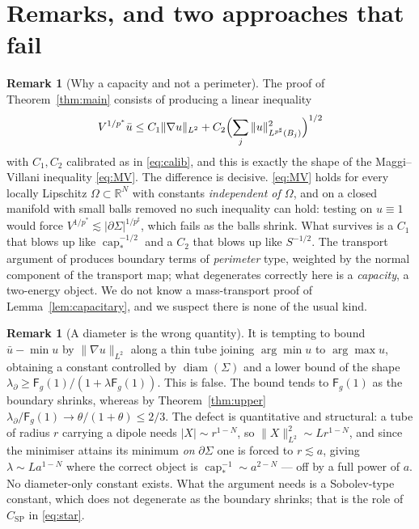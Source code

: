 \documentclass[11pt,reqno]{amsart}
\theoremstyle{plain}
\theoremstyle{definition}
\newtheorem{remark}[theorem]{Remark}
\newcommand{\R}{\mathbb{R}}
\newcommand{\pstar}{p^{*}}
\newcommand{\psharp}{p^{\sharp}}
\newcommand{\cpstar}{\operatorname{cap}_{*}}
\newcommand{\Fq}{\mathsf{F}}
\newcommand{\Csp}{C_{\mathrm{SP}}}
\begin{document}
\section{Remarks, and two approaches that fail}
\label{sec:remarks}

\begin{remark}[Why a capacity and not a perimeter]
\label{rem:mv}
The proof of Theorem~\ref{thm:main} consists of producing a linear inequality
\[
  V^{1/\pstar}\bar u\le C_1\|\nabla u\|_{L^2}+C_2\Bigl(\sum_j\|u\|^2_{L^{\psharp}(B_j)}\Bigr)^{1/2}
\]
with $C_1,C_2$ calibrated as in \eqref{eq:calib}, and this is exactly the shape of
the Maggi--Villani inequality \eqref{eq:MV}. The difference is decisive.
\eqref{eq:MV} holds for every locally Lipschitz $\Omega\subset\R^N$ with constants
\emph{independent of $\Omega$}, and on a closed manifold with small balls removed
no such inequality can hold: testing on $u\equiv1$ would force
$V^{1/\pstar}\lesssim|\partial\Sigma|^{1/\psharp}$, which fails as the balls
shrink. What survives is a $C_1$ that blows up like $\cpstar^{-1/2}$ and a $C_2$
that blows up like $S^{-1/2}$. The transport argument of
\cite{CNV2004,Nazaret2006,MaggiVillani2005} produces boundary terms of
\emph{perimeter} type, weighted by the normal component of the transport map; what
degenerates correctly here is a \emph{capacity}, a two-energy object. We do not
know a mass-transport proof of Lemma~\ref{lem:capacitary}, and we suspect there is
none of the usual kind.
\end{remark}

\begin{remark}[A diameter is the wrong quantity]
\label{rem:diameter}
It is tempting to bound $\bar u-\min u$ by $\|\nabla u\|_{L^2}$ along a thin tube
joining $\arg\min u$ to $\arg\max u$, obtaining a constant controlled by
$\operatorname{diam}(\Sigma)$ and a lower bound of the shape
$\lambda_\partial\ge\Fq_g(1)/(1+\lambda\Fq_g(1))$. This is false. The bound tends
to $\Fq_g(1)$ as the boundary shrinks, whereas by Theorem~\ref{thm:upper}
$\lambda_\partial/\Fq_g(1)\to\theta/(1+\theta)\le2/3$. The defect is quantitative
and structural: a tube of radius $r$ carrying a dipole needs
$|X|\sim r^{1-N}$, so $\|X\|^2_{L^2}\sim Lr^{1-N}$, and since the minimiser
attains its minimum \emph{on} $\partial\Sigma$ one is forced to $r\lesssim a$,
giving $\lambda\sim La^{1-N}$ where the correct object is
$\cpstar^{-1}\sim a^{2-N}$ — off by a full power of $a$. No diameter-only constant
exists. What the argument needs is a Sobolev-type constant, which does not
degenerate as the boundary shrinks; that is the role of $\Csp$ in \eqref{eq:star}.
\end{remark}
\end{document}
